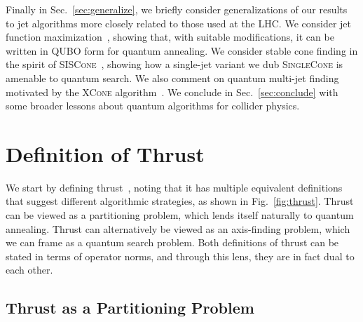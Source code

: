 \documentclass[aps,prd,twocolumn,superscriptaddress,preprintnumbers,nofootinbib,longbibliography,floatfix]{revtex4-1}
\DeclareRobustCommand{\Sec}[1]{Sec.~\ref{#1}}
\DeclareRobustCommand{\Fig}[1]{Fig.~\ref{#1}}
\begin{document}
Finally in \Sec{sec:generalize}, we briefly consider generalizations of our results to jet algorithms more closely related to those used at the \ac{LHC}.
%
We consider jet function maximization~\cite{Georgi:2014zwa,Ge:2014ova,Bai:2014qca}, showing that, with suitable modifications, it can be written in \ac{QUBO} form for quantum annealing.
%
We consider stable cone finding in the spirit of \textsc{SISCone}~\cite{Salam:2007xv}, showing how a single-jet variant we dub \textsc{SingleCone} is amenable to quantum search.
%
We also comment on quantum multi-jet finding motivated by the \textsc{XCone} algorithm~\cite{Stewart:2015waa,Thaler:2015xaa}.
%
We conclude in \Sec{sec:conclude} with some broader lessons about quantum algorithms for collider physics.


%
%

\section{Definition of Thrust}
\label{sec:def}


We start by defining thrust~\cite{Brandt:1964sa,Farhi:1977sg,DeRujula:1978vmq}, noting that it has multiple equivalent definitions that suggest different algorithmic strategies, as shown in \Fig{fig:thrust}. 
%
Thrust can be viewed as a partitioning problem, which lends itself naturally to quantum annealing.
%
Thrust can alternatively be viewed as an axis-finding problem, which we can frame as a quantum search problem.
%
Both definitions of thrust can be stated in terms of operator norms, and through this lens, they are in fact dual to each other.


\subsection{Thrust as a Partitioning Problem}
\label{subsec:thrustpart}
\end{document}
